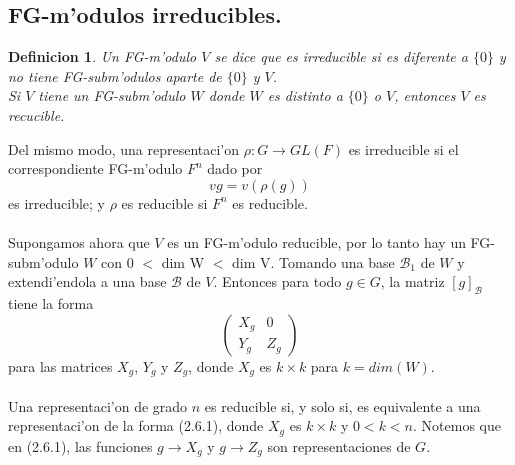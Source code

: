 \documentclass[a4paper,openright,12pt]{report}
\numberwithin{equation}{section} %
\newtheorem{definicion}{Definicion}[section] %
\begin{document}
\subsection{FG-m'odulos irreducibles.}
\begin{definicion}
Un FG-m'odulo $V$ se dice que es irreducible si es diferente a $\{0\}$ y no tiene FG-subm'odulos aparte de $\{0\}$ y $V$.\\
Si $V$ tiene un FG-subm'odulo $W$ donde $W$ es distinto a $\{0\}$ o $V$, entonces $V$ es recucible.
\end{definicion}
Del mismo modo, una representaci'on $\rho : G \rightarrow GL(F)$ es irreducible si el correspondiente FG-m'odulo $F^{n}$ dado por
\[
vg=v(\rho (g))
\]
es irreducible; y $\rho$ es reducible si $F^{n}$ es reducible.\\
\\
Supongamos ahora que $V$ es un FG-m'odulo reducible, por lo tanto hay un FG-subm'odulo $W$ con 0 $<$ dim W $<$ dim V. Tomando una base $\mathscr{B_{1}}$ de $W$ y extendi'endola a una base $\mathscr{B}$ de $V$. Entonces para todo $g \in G$, la matriz $[g]_{\mathscr{B}}$ tiene la forma
\begin{equation}
\left( \begin{array}{c|c}
  X_{g} & 0 \\ 
  \hline
  Y_{g} & Z_{g}
 \end{array} \right)
\end{equation}
para las matrices $X_{g}$, $Y_{g}$ y $Z_{g}$, donde $X_{g}$ es $k \times k$ para $k=dim(W)$.\\
\\
Una representaci'on de grado $n$ es reducible si, y solo si, es equivalente a una representaci'on de la forma (2.6.1), donde $X_{g}$ es $k \times k$ y $0 < k < n$. Notemos que en (2.6.1), las funciones $g \rightarrow X_{g}$ y $g \rightarrow Z_{g}$ son representaciones de $G$.
\end{document}
